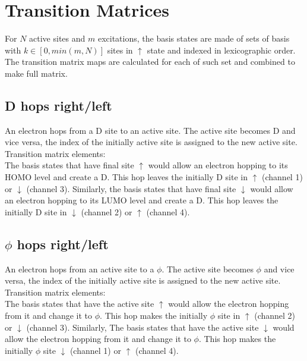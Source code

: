 \documentclass[a4paper]{revtex4-1} %
\newcommand{\da}{\downarrow}
\newcommand{\ua}{\uparrow}
\begin{document}
\section{Transition Matrices}
For $N$ active sites and $m$ excitations,
the basis states are made of sets of basis with $k\in [0,min(m,N)]$ sites in $\ua$ state
and indexed in lexicographic order.
The transition matrix maps are calculated for each of such set and combined to make full matrix.


\subsection{D hops right/left}
An electron hops from a D site to an active site.
The active site becomes D and vice versa, the index of the initially active site is assigned to the new active site. 
\\Transition matrix elements:\\
The basis states that have final site $\ua$ would allow 
an electron hopping to its HOMO level and create a D.
This hop leaves the initially D site in $\ua$ (channel 1) or $\da$  (channel 3).
Similarly,
the basis states that have final site $\da$ would allow 
an electron hopping to its LUMO level and create a D.
This hop leaves the initially D site in $\da$ (channel 2) or $\ua$  (channel 4).



\subsection{$\phi$ hops right/left}
An electron hops from an active site to a $\phi$.
The active site becomes $\phi$ and vice versa, the index of the initially active site is assigned to the new active site. 
\\Transition matrix elements:\\
The basis states that have the active site $\ua$ would allow 
the electron hopping from it and change it to $\phi$.
This hop makes the initially $\phi$ site in $\ua$ (channel 2) or $\da$  (channel 3).
Similarly,
The basis states that have the active site $\da$ would allow 
the electron hopping from it and change it to $\phi$.
This hop makes the initially $\phi$ site $\da$ (channel 1) or $\ua$  (channel 4).
\end{document}

